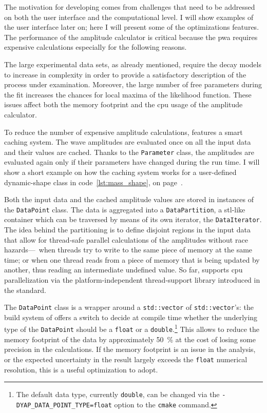     The motivation for developing  comes from challenges that need to be addressed on both the user interface and the computational level.
    I will show examples of the user interface later on; here I will present some of the optimizations  features.
    The performance of the amplitude calculator is critical because the \ac{pwa} requires expensive calculations especially for the following reasons.


    The large experimental data sets, as already mentioned, require the decay models to increase in complexity in order to provide a satisfactory description of the process under examination.
    Moreover, the large number of free parameters during the fit increases the chances for local maxima of the likelihood function.
    These issues affect both the memory footprint and the \acs{cpu} usage of the amplitude calculator.


    To reduce the number of expensive amplitude calculations,  features a smart caching system.
    The wave amplitudes are evaluated once on all the input data and their values are cached.
    Thanks to the \lstinline!Parameter! class, the amplitudes are evaluated again only if their parameters have changed during the run time.
    I will show a short example on how the caching system works for a user-defined dynamic-shape class in code~\ref{lst:mass_shape}, on page~\pageref{lst:mass_shape}.


    Both the input data and the cached amplitude values are stored in instances of the \lstinline!DataPoint! class.
    The data is aggregated into a \lstinline!DataPartition!, a \ac{stl}-like container which can be traversed by means of its own iterator, the \lstinline!DataIterator!.
    The idea behind the partitioning is to define disjoint regions in the input data that allow for thread-safe parallel calculations of the amplitudes without race hazards---\ie~when threads try to write to the same piece of memory at the same time; or when one thread reads from a piece of memory that is being updated by another, thus reading an intermediate undefined value.
    So far,  supports \acs{cpu} parallelization via the platform-independent thread-support library introduced in the \cpp[11]{} standard.


    The \lstinline!DataPoint! class is a wrapper around a \lstinline!std::vector! of \lstinline!std::vector!'s: the build system of  offers a switch to decide at compile time whether the underlying type of the \lstinline!DataPoint! should be a \lstinline!float! or a \lstinline!double!.\footnote{The default data type, currently \lstinline!double!, can be changed via the \lstinline[language=bash]|-DYAP_DATA_POINT_TYPE=float| option to the \lstinline!cmake! command.}
    This allows to reduce the memory footprint of the data by approximately \SI{50}{\percent} at the cost of losing some precision in the calculations.
    If the memory footprint is an issue in the analysis, or the expected uncertainty in the result largely exceeds the \lstinline!float! numerical resolution, this is a useful optimization to adopt.


